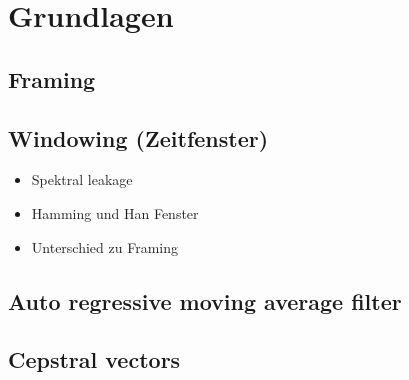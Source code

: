 \section{Grundlagen}\label{sec:Grundlagen}
\subsection{Framing}
\subsection{Windowing (Zeitfenster)}
\begin{itemize}
  \item Spektral leakage
  \item Hamming und Han Fenster
  \item Unterschied zu Framing
\end{itemize}
\subsection{Auto regressive moving average filter}
\subsection{Cepstral vectors}